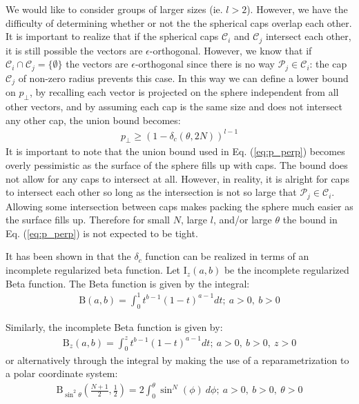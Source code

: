We would like to consider groups of larger sizes (ie. $l> 2$). However, we have the difficulty of determining whether or not the the spherical caps overlap each other. It is important to realize that if the spherical caps $\mathcal{C}_i$ and $\mathcal{C}_j$ intersect each other, it is still possible the vectors are $\epsilon$-orthogonal. However, we know that if $\mathcal{C}_i\cap\mathcal{C}_j = \lbrace \emptyset \rbrace$ the vectors are $\epsilon$-orthogonal since there is no way $\mathcal{P}_j\in\mathcal{C}_i$: the cap $\mathcal{C}_j$ of non-zero radius prevents this case. In this way we can define a lower bound on $p_\perp$, by recalling each vector is projected on the sphere independent from all other vectors, and by assuming each cap is the same size and does not intersect any other cap, the union bound becomes:
\begin{equation}\label{eq:p_perp}
    \begin{aligned}
        p_{\perp} \geq (1-\delta_c(\theta,2N))^{l-1}
    \end{aligned}
\end{equation}
It is important to note that the union bound used in Eq. (\ref{eq:p_perp}) becomes overly pessimistic as the surface of the sphere fills up with caps. The bound does not allow for any caps to intersect at all. However, in reality, it is alright for caps to intersect each other so long as the intersection is not so large that $\mathcal{P}_j\in\mathcal{C}_i$. Allowing some intersection between caps makes packing the sphere much easier as the surface fills up. Therefore for small $N$, large $l$, and/or large $\theta$ the bound in Eq. (\ref{eq:p_perp}) is not expected to be tight.

It has been shown in \cite{Li2011} that the $\delta_c$ function can be realized in terms of an incomplete regularized beta function. Let $\text{I}_z(a,b)$ be the incomplete regularized Beta function. The Beta function is given by the integral:
\begin{equation}\label{eq:beta}
    \begin{aligned}
        \text{B}(a,b) = \int_0^1 t^{b-1}(1-t)^{a-1}dt; \ a>0,\ b>0
    \end{aligned}
\end{equation}

Similarly, the incomplete Beta function is given by:
\begin{equation}\label{eq:beta_inc}
    \begin{aligned}
        \text{B}_z(a,b) = \int_0^z t^{b-1}(1-t)^{a-1}dt; \ a>0,\ b>0,\ z>0
    \end{aligned}
\end{equation}
or alternatively through the integral by making the use of a reparametrization to a polar coordinate system:
\begin{equation}\label{eq:beta_inc_sin}
    \begin{aligned}
        \text{B}_{\sin^2\theta}(\frac{N+1}{2},\frac{1}{2}) = 2\int_0^\theta \sin^N (\phi)\ d\phi; \ a>0,\ b>0,\ \theta>0
    \end{aligned}
\end{equation}

